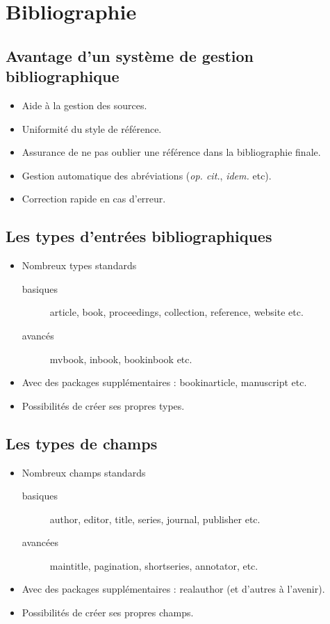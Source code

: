 \section{Bibliographie}

\subsection{Avantage d'un système de gestion bibliographique}
\begin{slide}
  \begin{itemize}
    \item Aide à la gestion des sources.
    \item Uniformité du style de référence.
    \item Assurance de ne pas oublier une référence dans la bibliographie finale.
    \item Gestion automatique des abréviations (\emph{op. cit.}, \emph{idem.} etc).
    \item Correction rapide en cas d'erreur.
  \end{itemize}
\end{slide}
\subsection{Les types d'entrées bibliographiques}
\begin{slide}
  \begin{itemize}
    \item Nombreux types standards
      \begin{description}
	\item[basiques] article, book, proceedings, collection, reference, website etc.
	\item[avancés] mvbook, inbook, bookinbook etc.
      \end{description}
    \item Avec des packages supplémentaires : bookinarticle, manuscript etc.
    \item Possibilités de créer ses propres types. 
  \end{itemize}
\end{slide}
\subsection{Les types de champs}
\begin{slide}
  \begin{itemize}
    \item Nombreux champs standards
      \begin{description}
	\item[basiques] author, editor, title, series, journal,  publisher etc.
	\item[avancées] maintitle, pagination, shortseries,  annotator, etc.
      \end{description}
    \item Avec des packages supplémentaires : realauthor (et d'autres à l'avenir).
    \item Possibilités de créer ses propres champs.
  \end{itemize}
\end{slide}

